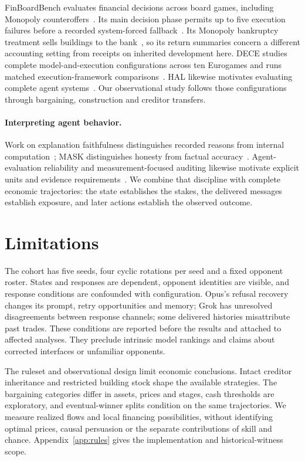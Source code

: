 FinBoardBench evaluates financial decisions across board games, including Monopoly counteroffers~\cite[\S3.2]{hu2026finboardbench}. Its main decision phase permits up to five execution failures before a recorded system-forced fallback~\cite[App.~E]{hu2026finboardbench}. Its Monopoly bankruptcy treatment sells buildings to the bank~\cite[App.~C.3]{hu2026finboardbench}, so its return summaries concern a different accounting setting from receipts on inherited development here. DECE studies complete model-and-execution configurations across ten Eurogames and runs matched execution-framework comparisons~\cite{zhang2026dece}. HAL likewise motivates evaluating complete agent systems~\cite{kapoor2026hal}. Our observational study follows those configurations through bargaining, construction and creditor transfers.

\paragraph{Interpreting agent behavior.} Work on explanation faithfulness distinguishes recorded reasons from internal computation~\cite{turpin2023unfaithful,lanham2023faithfulness}; MASK distinguishes honesty from factual accuracy~\cite{ren2025mask}. Agent-evaluation reliability and measurement-focused auditing likewise motivate explicit units and evidence requirements~\cite{hardy2026reliability,yang2026measurement}. We combine that discipline with complete economic trajectories: the state establishes the stakes, the delivered messages establish exposure, and later actions establish the observed outcome.

\section{Limitations}

The cohort has five seeds, four cyclic rotations per seed and a fixed opponent roster. States and responses are dependent, opponent identities are visible, and response conditions are confounded with configuration. Opus's refusal recovery changes its prompt, retry opportunities and memory; Grok has unresolved disagreements between response channels; some delivered histories misattribute past trades. These conditions are reported before the results and attached to affected analyses. They preclude intrinsic model rankings and claims about corrected interfaces or unfamiliar opponents.

The ruleset and observational design limit economic conclusions. Intact creditor inheritance and restricted building stock shape the available strategies. The bargaining categories differ in assets, prices and stages, cash thresholds are exploratory, and eventual-winner splits condition on the same trajectories. We measure realized flows and local financing possibilities, without identifying optimal prices, causal persuasion or the separate contributions of skill and chance. Appendix~\ref{app:rules} gives the implementation and historical-witness scope.

